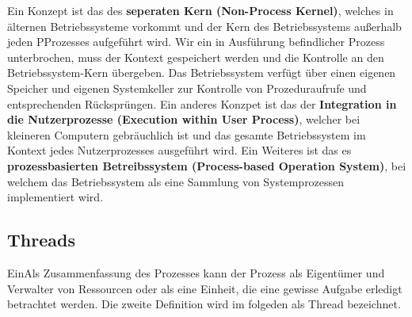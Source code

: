 \documentclass{article}
\begin{document}
    Ein Konzept ist das des \textbf{seperaten Kern (Non-Process Kernel)}, welches in älternen Betriebssysteme vorkommt und der Kern des Betriebssystems außerhalb jeden PProzesses aufgeführt wird. Wir ein in Ausführung befindlicher Prozess unterbrochen, muss der Kontext gespeichert werden und die Kontrolle an den Betriebssystem-Kern übergeben. Das Betriebssystem verfügt über einen eigenen Speicher und eigenen Systemkeller zur Kontrolle von Prozeduraufrufe und entsprechenden Rücksprüngen. Ein anderes Konzpet ist das der \textbf{Integration in die Nutzerprozesse (Execution within User Process)}, welcher bei kleineren  Computern gebräuchlich ist und das gesamte Betriebssystem im Kontext jedes Nutzerprozesses ausgeführt wird. Ein Weiteres ist das es \textbf{prozessbasierten Betreibssystem (Process-based Operation System)}, bei welchem das Betriebssystem als eine Sammlung von Systemprozessen implementiert wird.   
\subsection{Threads}
    EinAls Zusammenfassung des Prozesses kann der Prozess als Eigentümer und Verwalter von Ressourcen oder als eine Einheit, die eine gewisse Aufgabe erledigt betrachtet werden. Die zweite Definition wird im folgeden als Thread bezeichnet.
\end{document}
